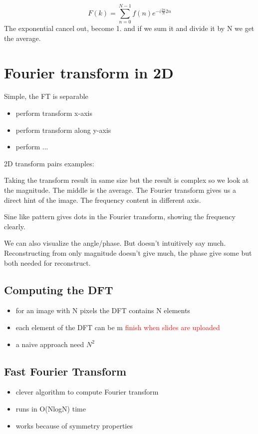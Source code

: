 \begin{equation}
F(k) = \sum_{n=0}^{N-1} f(n)e^{-i \frac{2\pi} {N}2n } %
\end{equation}
The exponential cancel out, become 1. and if we sum it and divide it by N we get the average.


\section{Fourier transform in 2D}
Simple, the FT is separable
\begin{itemize}
	\item perform transform x-axis
	\item perform transform along y-axis
	\item perform ...
\end{itemize}

2D transform pairs examples: 

Taking the transform result in same size but the result is complex so we look at the magnitude. The middle is the average. The Fourier transform gives us a direct hint of the image. The frequency content in different axis.

Sine like pattern gives dots in the Fourier transform, showing the frequency clearly. 

We can also visualize the angle/phase. But doesn't intuitively say much. Reconstructing from only magnitude doesn't give much, the phase give some but both needed for reconstruct. 

\subsection*{Computing the DFT}
\begin{itemize}
	\item for an image with N pixels the DFT contains N elements
	\item each element of the DFT can be m \textcolor{red}{finish when slides are uploaded} 
	\item a naive approach need $N^{2}$
\end{itemize}


\subsection*{Fast Fourier Transform }
\begin{itemize}
	\item clever algorithm to compute Fourier transform
	\item runs in O(NlogN) time
	\item works because of symmetry properties
\end{itemize}


